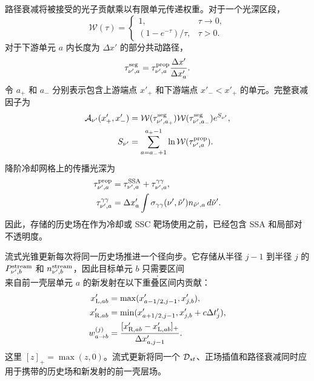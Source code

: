\documentclass[twocolumn]{aastex702}
\begin{document}
路径衰减将被接受的光子贡献乘以有限单元传递权重。对于一个光深区段，
\begin{equation}
\mathcal W(\tau)=
\begin{cases}
1, & \tau\to0,\\
(1-e^{-\tau})/\tau, & \tau>0 .
\end{cases}
\end{equation}
对于下游单元 \(a\) 内长度为 \(\Delta x'\) 的部分共动路径，
\begin{equation}
\tau_{\nu',a}^{\rm seg}
=\tau_{\nu',a}^{\rm prop}
\frac{\Delta x'}{\Delta x'_a}.
\end{equation}
令 \(a_+\) 和 \(a_-\) 分别表示包含上游端点 \(x'_+\) 和下游端点 \(x'_-<x'_+\) 的单元。完整衰减因子为
\begin{equation}
\begin{aligned}
{\cal A}_{\nu'}(x'_+,x'_-)
&=\mathcal W(\tau_{\nu',a_+}^{\rm seg})
\mathcal W(\tau_{\nu',a_-}^{\rm seg})e^{S_{\nu'}},\\
S_{\nu'}
&=\sum_{a=a_-+1}^{a_+-1}
\ln\mathcal W(\tau_{\nu',a}^{\rm prop}) .
\end{aligned}
\end{equation}
降阶冷却网格上的传播光深为
\begin{equation}
\begin{aligned}
\tau_{\nu',a}^{\rm prop}
&=\tau_{\nu',a}^{\rm SSA}
+\tau_{\nu',a}^{\gamma\gamma},\\
\tau_{\nu',a}^{\gamma\gamma}
&=\Delta x'_a\int \sigma_{\gamma\gamma}(\nu',\tilde\nu')
n_{\tilde\nu',a}\,d\tilde\nu' .
\end{aligned}
\end{equation}
因此，存储的历史场在作为冷却或 SSC 靶场使用之前，已经包含 SSA 和局部对不透明度。

流式光锥更新每次将同一历史场推进一个径向步。它存储从半径 \(j-1\) 到半径 \(j\) 的 \(P_{\nu',b}^{\rm stream}\) 和 \(n_{\nu',b}^{\rm stream}\)，因此目标单元 \(b\) 只需要区间
\begin{equation}
[x'_{j,b},\,x'_{j,b}+c(t'_j-t'_{j-1})].
\end{equation}
来自前一壳层单元 \(a\) 的新发射在以下重叠区间内贡献：
\begin{equation}
\begin{aligned}
x'_{{\rm L},ab}
&=\max(x'_{a-1/2,j-1},x'_{j,b}),\\
x'_{{\rm R},ab}
&=\min(x'_{a+1/2,j-1},x'_{j,b}+c\Delta t'_j),\\
w_{a\to b}^{(j)}
&=\frac{[x'_{{\rm R},ab}-x'_{{\rm L},ab}]_+}
{\Delta x'_{a,j-1}} .
\end{aligned}
\end{equation}
这里 \([z]_+=\max(z,0)\)。流式更新将同一个 \({\cal D}_{st}\)、正场插值和路径衰减同时应用于携带的历史场和新发射的前一壳层场。
\end{document}
